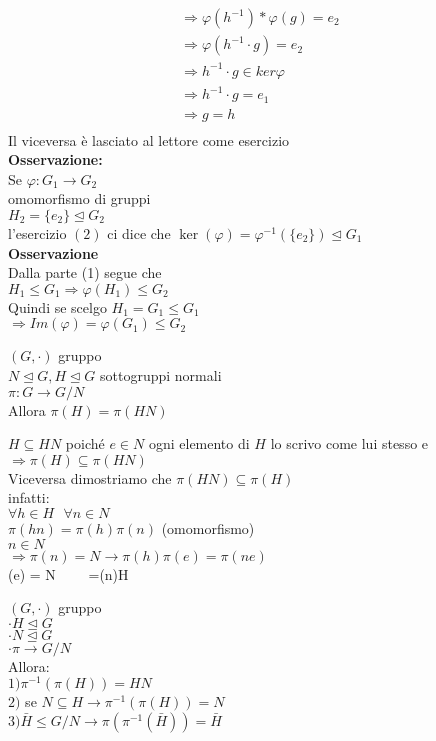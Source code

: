 \documentclass[12px]{article}
\begin{document}
{\begin{gather*}
		\Rightarrow \varphi(h^{-1})* \varphi(g) = e_2\\
		\Rightarrow \varphi(h^{-1}\cdot g) = e_2\\
	 \Rightarrow h^{-1}\cdot g\in ker \varphi\\
	 \Rightarrow h^{-1}\cdot g = e_1\\
	 \Rightarrow g = h\\
	\end{gather*}
	Il viceversa è lasciato  al lettore come esercizio\\
	 \textbf{Osservazione:}\\
	 Se $ \varphi:G_1 \rightarrow G_2$\\
	 omomorfismo di gruppi\\
	 $H_2 = \lbrace e_2 \rbrace \trianglelefteq G_2$\\
	 l'esercizio $(2)$ ci dice che  $\ker( \varphi) = \varphi^{-1}(\lbrace e_2\rbrace)\trianglelefteq G_1$\\
	 \textbf{Osservazione}\\
	 Dalla parte (1) segue che\\
	 $H_1\leq G_1 \Rightarrow \varphi(H_1)\leq G_2$ \\
	 Quindi  se scelgo $H_1=G_1\leq G_1$\\
	 $ \Rightarrow Im( \varphi) = \varphi(G_1)\leq G_2$ 
	 \begin{lemm}
	 	
	 $(G,\cdot)$ gruppo\\
	 $N\trianglelefteq G, H\trianglelefteq G$ sottogruppi normali\\
	  $\pi: G \rightarrow G/N$\\
	  Allora $\pi(H) = \pi(HN)$\\
	 \end{lemm}
	  \begin{dimo}
	  	$H\subseteq HN$ poiché $e\in N$ ogni elemento di  $H$ lo scrivo come lui stesso e $ \Rightarrow \pi(H)\subseteq \pi(HN)$ \\
		Viceversa dimostriamo che $\pi(HN) \subseteq \pi(H)$\\
		infatti:\\
		 $\forall h\in H \ \ \ \forall n\in N$\\
		  $\pi(hn)=\pi(h)\pi(n)$ (omomorfismo)\\
		   $n\in N$\\
		    $ \Rightarrow \pi(n) = N \rightarrow \pi(h)\pi(e) = \pi(ne)$ \\
		    \pi(e) = N \ \ \ \ =\pi(n)\in \pi H
	  \end{dimo}
	  \begin{lemm}
	  	$(G,\cdot)$ gruppo\\
		$\cdot H\trianglelefteq G$\\
		$\cdot N\trianglelefteq G$\\
		$\cdot \pi \rightarrow G/N$\\
		Allora:\\
		$1)\pi^{-1}(\pi(H))=HN$\\
		$2)$ se $N\subseteq H \rightarrow\pi^{-1}(\pi(H)) = N$\\
		$3) \bar H\leq G/N \rightarrow \pi(\pi^{-1}(\bar H)) = \bar H$


\end{lemm}}
\end{document}
